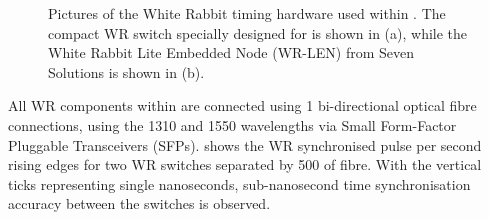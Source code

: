 \begin{figure} %
    \centering
    \quad
    \caption[Pictures of the White Rabbit timing hardware used within \chipsfive]
    {Pictures of the White Rabbit timing hardware used within \chipsfive. The compact WR switch
        specially designed for \chips is shown in (a), while the White Rabbit Lite Embedded Node
        (WR-LEN) from Seven Solutions is shown in (b).}
    \label{fig:wr_electronics}
\end{figure}

All WR components within \chipsfive are connected using \unit{1}{} bi-directional optical
fibre connections, using the \unit{1310}{} and \unit{1550}{} wavelengths via
Small Form-Factor Pluggable Transceivers (SFPs).  shows the WR synchronised
pulse per second rising edges for two \chipsfive WR switches separated by \unit{500}{} of
fibre. With the vertical ticks representing single nanoseconds, sub-nanosecond time
synchronisation accuracy between the switches is observed.

